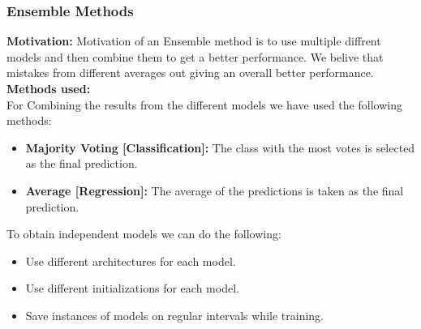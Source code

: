 \documentclass{beamer}
\begin{document}


\begin{frame}
    \frametitle{Ensemble Methods}

    \textbf{Motivation:} Motivation of an Ensemble method is to use multiple diffrent models and then combine them to get a better performance. 
    We belive that mistakes from different averages out giving an overall better performance. \\

    \textbf{Methods used:} \\
    For Combining the results from the different models we have used the following methods: 
    \begin{itemize}
        \item \textbf{Majority Voting [Classification]:} The class with the most votes is selected as the final prediction.
        \item \textbf{Average [Regression]:} The average of the predictions is taken as the final prediction.
    \end{itemize}
    To obtain independent models we can do the following:
    \begin{itemize}
        \item Use different architectures for each model.
        \item Use different initializations for each model.
        \item Save instances of models on regular intervals while training.
    \end{itemize}

    

\end{frame}
\end{document}
